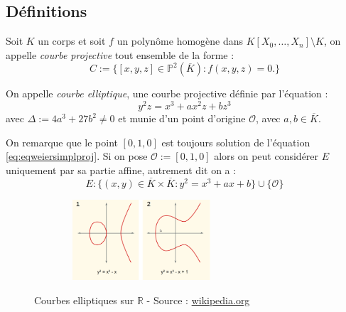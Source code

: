 \documentclass[a4paper]{article} %
\numberwithin{section}{part}
\numberwithin{equation}{section}
\newcommand\RR{\mathbb{R}}
\newcommand\EO{\mathcal{O}}
\newcommand\PP[1]{\mathbb{P}^{#1}}
\begin{document}
\subsection{Définitions}
\label{sec:elldef}
Soit $K$ un corps et soit $f$ un polynôme homogène dans
$K[X_0,\dots,X_n]\setminus K$, 
on appelle \emph{courbe projective} tout ensemble de la forme :
\begin{equation}
C := \lbrace{[x,y,z]\in \PP{2}(\overline{K}) : f(x,y,z) = 0}.\rbrace
\end{equation}
\begin{defn}
On appelle \emph{courbe elliptique}, une courbe projective définie par 
l'équation :
\begin{equation}
\label{eq:eqweiersimplproj}
y^2z = x^3 + ax^2z + bz^3
\end{equation}
avec $\Delta := 4a^3 + 27b^2\neq0$ et munie d'un point d'origine $\EO$, avec
$a,b\in\overline{K}$.
\end{defn}
\begin{rem}
On remarque que le point $[0,1,0]$ est toujours solution de l'équation
\ref{eq:eqweiersimplproj}. Si on pose $\EO := [0,1,0]$ alors on peut considérer
$E$ uniquement par sa partie affine, autrement dit on a :
\begin{equation}
\label{eq:weiersimpl}
E : \lbrace{(x,y)\in\overline{K}\times\overline{K} : y^2 = x^3 + ax + b}\rbrace
\cup\lbrace{\EO}\rbrace
\end{equation}
\end{rem}
\begin{figure}[H]
\begin{center}
\includegraphics[width=8cm, height=3cm]{EllipticCurves}\\
\caption{Courbes elliptiques sur $\RR$ - Source : 
\href{http://en.wikipedia.org/wiki/Elliptic_curve}{wikipedia.org} }
\label{fig:ellcurve}
\end{center}
\end{figure}
\end{document}
